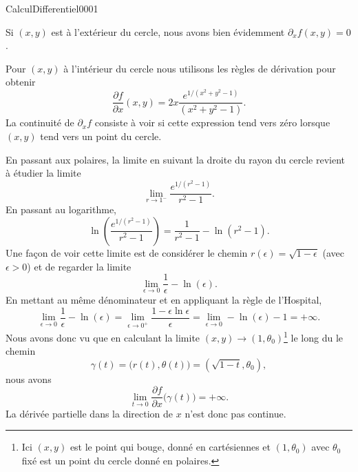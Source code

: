 \begin{corrige}{CalculDifferentiel0001}
\begin{enumerate}
            Si \( (x,y)\) est à l'extérieur du cercle, nous avons bien évidemment \( \partial_xf(x,y)=0\).

            Pour \( (x,y)\) à l'intérieur du cercle nous utilisons les règles de dérivation pour obtenir
            \begin{equation}
                \frac{ \partial f }{ \partial x }(x,y)=2x\frac{  e^{1/(x^2+y^2-1)} }{ (x^2+y^2-1) }.
            \end{equation}
            La continuité de \( \partial_xf\) consiste à voir si cette expression tend vers zéro lorsque \( (x,y)\) tend vers un point du cercle. 

            En passant aux polaires, la limite en suivant la droite du rayon du cercle revient à étudier la limite
            \begin{equation}
                \lim_{r\to 1^-} \frac{  e^{1/(r^2-1)} }{ r^2-1 }.
            \end{equation}
            En passant au logarithme,
            \begin{equation}
                \ln\left( \frac{  e^{1/(r^2-1)} }{ r^2-1 } \right)=\frac{1}{ r^2-1 }-\ln(r^2-1).
            \end{equation}
            Une façon de voir cette limite est de considérer le chemin \( r(\epsilon)=\sqrt{1-\epsilon}\) (avec \( \epsilon>0\)) et de regarder la limite
            \begin{equation}
                \lim_{\epsilon\to0}\frac{1}{ \epsilon }-\ln(\epsilon).
            \end{equation}
            En mettant au même dénominateur et en appliquant la règle de l'Hospital,
            \begin{equation}
                \lim_{\epsilon\to0}\frac{1}{ \epsilon }-\ln(\epsilon)=\lim_{\epsilon\to 0^+}\frac{ 1-\epsilon\ln\epsilon }{ \epsilon }=\lim_{\epsilon\to 0}-\ln(\epsilon)-1=+\infty.
            \end{equation}
            Nous avons donc vu que en calculant la limite \( (x,y)\to (1,\theta_0)\)\footnote{Ici \( (x,y)\) est le point qui bouge, donné en cartésiennes et \( (1,\theta_0)\) avec \( \theta_0\) fixé est un point du cercle donné en polaires.} le long du le chemin
            \begin{equation}
                \gamma(t)=\big( r(t),\theta(t) \big)=( \sqrt{1-t},\theta_0 ),
            \end{equation}
            nous avons
            \begin{equation}
                \lim_{t\to 0} \frac{ \partial f }{ \partial x }\big( \gamma(t) \big)=+\infty.
            \end{equation}
            La dérivée partielle dans la direction de \( x\) n'est donc pas continue.


\end{enumerate}
\end{corrige}
